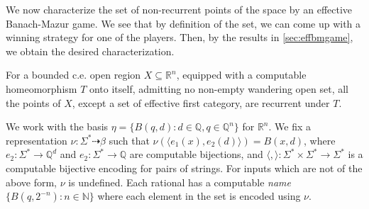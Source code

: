\documentclass[a4paper,UKenglish,autoref,thm-restate,numberwithinsect]{lipics-v2021}
\newcommand{\R}{\mathbb{R}}
\newcommand{\Q}{\mathbb{Q}}
\newcommand{\N}{\mathbb{N}}
\begin{document}
We now characterize the set of non-recurrent points of the space by an effective Banach-Mazur game. We see that by definition of the set, we can come up with a winning strategy for one of the players. Then, by the results in \cref{sec:effbmgame}, we obtain the desired characterization. 

\begin{theorem}\label{thm:effcatprt}
	For a bounded c.e. open region $X\subseteq\mathbb{R}^n$, equipped with a computable homeomorphism $T$ onto itself, admitting no non-empty wandering open set, all the points of $X$, except a set of effective first category, are recurrent under $T$. 
\end{theorem}

We work with the basis $\eta = \{B(q,d) : d \in \Q, q \in \Q^n\}$ for $\R^n$. We fix a representation $\nu: \Sigma^* \dashrightarrow \beta$ such that $\nu\left(\langle e_1(x), e_2(d)\rangle\right) = B(x,d)$, where $e_2: \Sigma^* \to \Q^d$ and $e_2: \Sigma^* \to \Q$ are computable bijections, and $\langle,\rangle: \Sigma^* \times \Sigma^* \to \Sigma^*$ is a computable bijective encoding for pairs of strings. For inputs which are not of the above form, $\nu$ is undefined. Each rational has a computable \emph{name} $\{B(q,2^{-n}) : n \in\N\}$ where each element in the set is encoded using $\nu$. 
\end{document}
